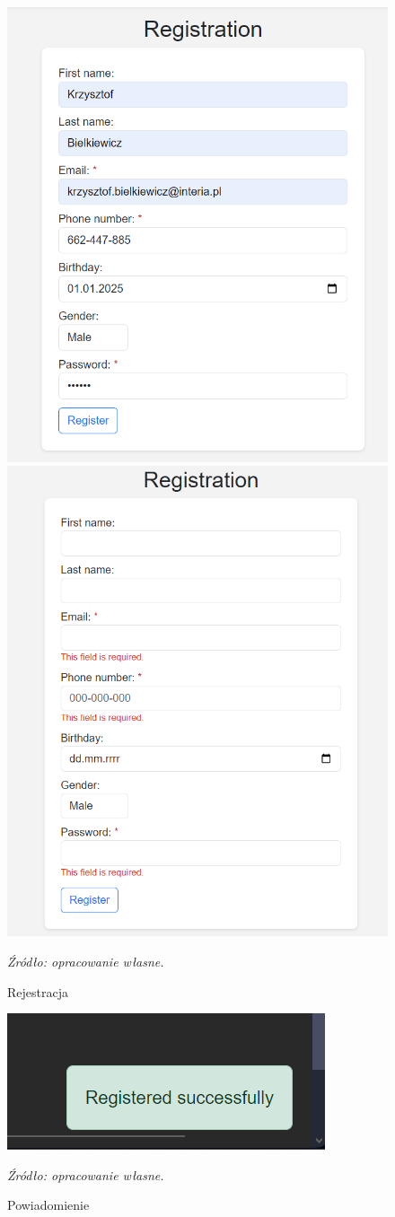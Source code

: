 \documentclass[12pt,a4paper,oneside]{article}
\theoremstyle{definition}
\numberwithin{equation}{section}
\begin{document}
\begin{figure}[H]
    \centering
    \includegraphics[width=0.5\columnwidth]{images/krzysztofBImages/register-login/registration.png}
    \includegraphics[width=0.48\columnwidth]{images/krzysztofBImages/register-login/register-errors.png}
    \caption{Rejestracja}
    \emph{Źródło: opracowanie własne.}
\end{figure}
\begin{figure}[H]
    \centering
    \includegraphics[width=0.6\columnwidth]{images/krzysztofBImages/register-login/message.png}
    \caption{Powiadomienie}
    \emph{Źródło: opracowanie własne.}
\end{figure}
\end{document}
